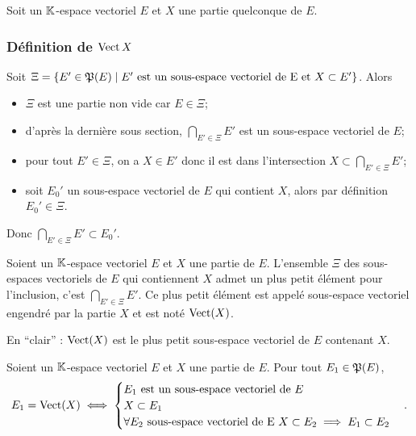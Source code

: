 Soit un \(\mathbb{K}\)-espace vectoriel \(E\) et \(X\) une partie quelconque de \(E\).

\subsubsection{Définition de \(\operatorname{Vect}{X}\)}

Soit \(\Xi=\left\{E' \in \mathfrak{P}(E)\mathrel{}\middle|\mathrel{}E' \text{~est un sous-espace vectoriel de E et } X \subset E'\right\}\). Alors
\begin{itemize}
\item \(\Xi\) est une partie non vide car \(E \in \Xi\);
\item d'après la dernière sous section, \(\bigcap_{E' \in \Xi} E'\) est un sous-espace vectoriel de \(E\);
\item pour tout \(E' \in \Xi\), on a \(X \in E'\) donc il est dans l'intersection \(X \subset \bigcap_{E' \in \Xi} E'\);
\item soit \(E_0'\) un sous-espace vectoriel de \(E\) qui contient \(X\), alors par définition \(E_0' \in \Xi\).
\end{itemize}

Donc \(\bigcap_{E' \in \Xi} E' \subset E_0'\).

\begin{defdef}
  Soient un \(\mathbb{K}\)-espace vectoriel \(E\) et \(X\) une partie de \(E\). L'ensemble \(\Xi\) des sous-espaces vectoriels de \(E\) qui contiennent \(X\) admet un plus petit élément pour l'inclusion, c'est \(\bigcap_{E' \in \Xi} E'\). Ce plus petit élément est appelé sous-espace vectoriel engendré par la partie \(X\) et est noté \(\operatorname{Vect}(X)\).

  En ``clair'' : \(\operatorname{Vect}(X)\) est le plus petit sous-espace vectoriel de \(E\) contenant \(X\).
\end{defdef}

\begin{prop}
  Soient un \(\mathbb{K}\)-espace vectoriel \(E\) et \(X\) une partie de \(E\). Pour tout \(E_1 \in \mathfrak{P}(E)\),
  \begin{equation}
    E_1 = \operatorname{Vect}(X) \iff
    \begin{cases}
      E_1 \text{~est un sous-espace vectoriel de } E \\
      X \subset E_1 \\
      \forall E_2 \text{~sous-espace vectoriel de E } X \subset E_2 \implies E_1 \subset E_2
    \end{cases}.
  \end{equation}
\end{prop}

